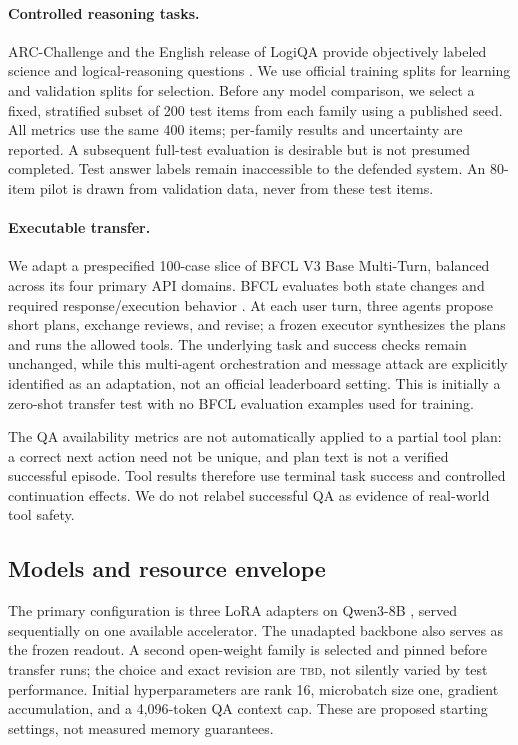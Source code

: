\documentclass[10pt,twocolumn]{article}
\newcommand{\TBD}{\textsc{tbd}}
\begin{document}
\paragraph{Controlled reasoning tasks.}
ARC-Challenge and the English release of LogiQA provide objectively labeled science and logical-reasoning questions \citep{clark2018arc,liu2020logiqa}. We use official training splits for learning and validation splits for selection. Before any model comparison, we select a fixed, stratified subset of 200 test items from each family using a published seed. All metrics use the same 400 items; per-family results and uncertainty are reported. A subsequent full-test evaluation is desirable but is not presumed completed. Test answer labels remain inaccessible to the defended system. An 80-item pilot is drawn from validation data, never from these test items.

\paragraph{Executable transfer.}
We adapt a prespecified 100-case slice of BFCL V3 Base Multi-Turn, balanced across its four primary API domains. BFCL evaluates both state changes and required response/execution behavior \citep{mao2024bfcl}. At each user turn, three agents propose short plans, exchange reviews, and revise; a frozen executor synthesizes the plans and runs the allowed tools. The underlying task and success checks remain unchanged, while this multi-agent orchestration and message attack are explicitly identified as an adaptation, not an official leaderboard setting. This is initially a zero-shot transfer test with no BFCL evaluation examples used for training.

The QA availability metrics are not automatically applied to a partial tool plan: a correct next action need not be unique, and plan text is not a verified successful episode. Tool results therefore use terminal task success and controlled continuation effects. We do not relabel successful QA as evidence of real-world tool safety.

\subsection{Models and resource envelope}
The primary configuration is three LoRA adapters \citep{hu2022lora} on Qwen3-8B \citep{qwen2025model}, served sequentially on one available accelerator. The unadapted backbone also serves as the frozen readout. A second open-weight family is selected and pinned before transfer runs; the choice and exact revision are \TBD{}, not silently varied by test performance. Initial hyperparameters are rank 16, microbatch size one, gradient accumulation, and a 4,096-token QA context cap. These are proposed starting settings, not measured memory guarantees.
\end{document}
